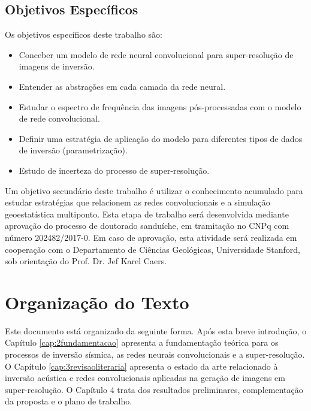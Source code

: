 \subsection{Objetivos Específicos}
Os objetivos específicos deste trabalho são:
\begin{itemize}
 \item Conceber um modelo de rede neural convolucional para super-resolução de imagens de inversão.
 \item Entender as abstrações em cada camada da rede neural.
 \item Estudar o espectro de frequência das imagens pós-processadas com o modelo de rede convolucional.
 \item Definir uma estratégia de aplicação do modelo para diferentes tipos de dados de inversão (parametrização).
 \item Estudo de incerteza do processo de super-resolução.
\end{itemize}

Um objetivo secundário deste trabalho é utilizar o conhecimento acumulado para estudar estratégias que
relacionem as redes convolucionais e a simulação geoestatística multiponto. Esta etapa de trabalho será desenvolvida
mediante aprovação do processo de doutorado sanduíche, em tramitação no CNPq com número 202482/2017-0.
Em caso de aprovação, esta atividade será realizada em cooperação com o Departamento
de Ciências Geológicas, Universidade Stanford, sob orientação do Prof. Dr. Jef Karel Caers.

\section{Organização do Texto}

Este documento está organizado da seguinte forma. Após esta breve introdução, o
Capítulo \ref{cap:2fundamentacao} apresenta a fundamentação teórica para os
processos de inversão sísmica, as redes neurais 
convolucionais e a super-resolução. O Capítulo \ref{cap:3revisaoliteraria} 
apresenta o estado da arte relacionado à inversão acústica  e
redes convolucionais aplicadas na geração de imagens em super-resolução. 
O Capítulo 4 %
trata dos resultados preliminares, complementação da proposta e o plano de trabalho.
